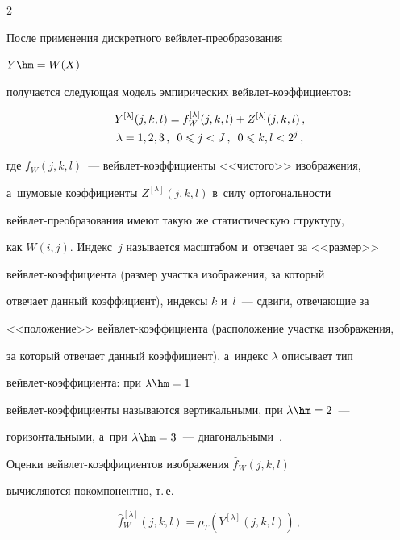 \begin{multicols}{2}
\begin{equation*}
\end{equation*}

После применения дискретного вейв\-лет-пре\-об\-ра\-зо\-ва\-ния 

$Y\hm=W(X)$~\cite{posobie} 

получается следующая модель эмпирических вейв\-лет-ко\-эф\-фи\-ци\-ентов:

\begin{multline*}

    Y^{[\lambda]}(j,k,l)=f^{[\lambda]}_W(j,k,l)+

    Z^{[\lambda]}(j,k,l)\,, \\ 

    \lambda=1,2,3\,,\enskip 0\leqslant j<J\,,\enskip 0\leqslant k,l< 2^j\,,

\end{multline*}

где $f_W(j,k,l)$~--- вейвлет-ко\-эф\-фи\-ци\-ен\-ты <<чис\-то\-го>> изображения, 

а~шумовые коэффициенты $Z^{[\lambda]}(j,k,l)$ в~силу ортогональности 

вейв\-лет-пре\-об\-ра\-зо\-ва\-ния имеют такую же статистическую структуру, 

как $W(i,j)$. Индекс~$j$ называется масштабом и~отвечает за <<размер>> 

вейв\-лет-ко\-эф\-фи\-ци\-ен\-та (размер участка изображения, за который 

отвечает данный коэффициент), индексы $k$ и~$l$~--- сдвиги, отвечающие за 

<<положение>> вейв\-лет-ко\-эф\-фи\-ци\-ен\-та (расположение участка изображения, 

за который отвечает данный коэффициент), а~индекс $\lambda$ описывает тип 

вейв\-лет-ко\-эф\-фи\-ци\-ен\-та: при $\lambda\hm=1$ 

вейв\-лет-ко\-эф\-фи\-ци\-ен\-ты называются вертикальными, при $\lambda\hm=2$~--- 

горизонтальными, а~при $\lambda\hm=3$~--- диагональными~\cite{smolentsev, bogges, malla}.





Оценки вейвлет-коэффициентов изображения $\hat{f}_W(j,k,l)$

вычисляются покомпонентно, т.\,е.

$$

\hat{f}^{[\lambda]}_W(j,k,l)=\rho_T(Y^{[\lambda]}(j,k,l))\,,

$$


\end{multicols}
